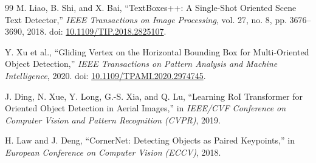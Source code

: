 \documentclass[11pt]{article}
\begin{document}
\begin{thebibliography}{99}
M. Liao, B. Shi, and X. Bai, ``TextBoxes++: A Single-Shot Oriented Scene Text
Detector,'' \textit{IEEE Transactions on Image Processing}, vol. 27, no. 8,
pp. 3676--3690, 2018. doi:
\href{https://doi.org/10.1109/TIP.2018.2825107}{10.1109/TIP.2018.2825107}.

Y. Xu et al., ``Gliding Vertex on the Horizontal Bounding Box for Multi-Oriented
Object Detection,'' \textit{IEEE Transactions on Pattern Analysis and Machine
Intelligence}, 2020. doi:
\href{https://doi.org/10.1109/TPAMI.2020.2974745}{10.1109/TPAMI.2020.2974745}.

J. Ding, N. Xue, Y. Long, G.-S. Xia, and Q. Lu, ``Learning RoI Transformer for
Oriented Object Detection in Aerial Images,'' in \textit{IEEE/CVF Conference on
Computer Vision and Pattern Recognition (CVPR)}, 2019.

H. Law and J. Deng, ``CornerNet: Detecting Objects as Paired Keypoints,'' in
\textit{European Conference on Computer Vision (ECCV)}, 2018.
\end{thebibliography}
\end{document}
